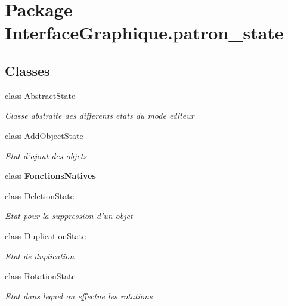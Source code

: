 \hypertarget{namespace_interface_graphique_1_1patron__state}{\section{Package Interface\-Graphique.\-patron\-\_\-state}
\label{namespace_interface_graphique_1_1patron__state}
}
\subsection*{Classes}
\begin{DoxyCompactItemize}
\item 
class \hyperlink{class_interface_graphique_1_1patron__state_1_1_abstract_state}{Abstract\-State}
\begin{DoxyCompactList}\small\item\em Classe abstraite des differents etats du mode editeur \end{DoxyCompactList}\item 
class \hyperlink{class_interface_graphique_1_1patron__state_1_1_add_object_state}{Add\-Object\-State}
\begin{DoxyCompactList}\small\item\em Etat d'ajout des objets \end{DoxyCompactList}\item 
class {\bfseries Fonctions\-Natives}
\item 
class \hyperlink{class_interface_graphique_1_1patron__state_1_1_deletion_state}{Deletion\-State}
\begin{DoxyCompactList}\small\item\em Etat pour la suppression d'un objet \end{DoxyCompactList}\item 
class \hyperlink{class_interface_graphique_1_1patron__state_1_1_duplication_state}{Duplication\-State}
\begin{DoxyCompactList}\small\item\em Etat de duplication \end{DoxyCompactList}\item 
class \hyperlink{class_interface_graphique_1_1patron__state_1_1_rotation_state}{Rotation\-State}
\begin{DoxyCompactList}\small\item\em Etat dans lequel on effectue les rotations \end{DoxyCompactList}\item 

\end{DoxyCompactItemize}
